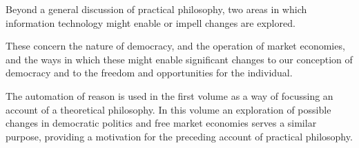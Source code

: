 Beyond a general discussion of practical philosophy, two areas in
which information technology might enable or impell changes are
explored.

These concern the nature of democracy, and the operation of market
economies, and the ways in which these might enable significant
changes to our conception of democracy and to the freedom and
opportunities for the individual.

The automation of reason is used in the first volume as a way of
focussing an account of a theoretical philosophy.
In this volume an exploration of possible changes in democratic
politics and free market economies serves a similar purpose, providing
a motivation for the preceding account of practical philosophy.
